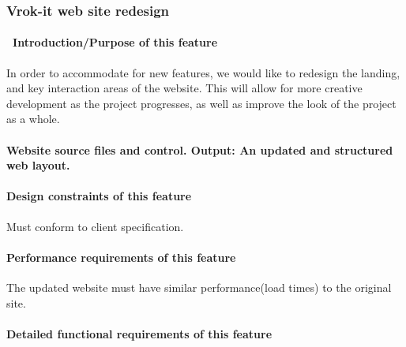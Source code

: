 \documentclass[letterpaper, 10pt, draftclsnofoot, onecolumn]{IEEEtran}
\begin{document}
{%


\subsubsection[{Redesign}]{\rmfamily\bfseries\color{black} Vrok-it  web site redesign}
\paragraph[\ Introduction/Purpose of this
feature]{\foreignlanguage{english}{\ }\foreignlanguage{english}{Introduction/Purpose
of this feature}}
{\color{black}
In order to accommodate for new features, we would like to redesign the landing,
and key interaction areas of the website. This will allow for more creative development
as the project progresses, as well as improve the look of the project as a whole.}

\paragraph[Input/Output sequence for this
feature]{\rmfamily\bfseries\color{black}
Website source files and control. Output: An updated and structured web layout.}

\paragraph[Design constraints of this
feature]{\rmfamily\bfseries\color{black} Design
constraints of this feature}
{\color{black}
Must conform to client specification.}

\paragraph[Performance requirements of this
feature]{\rmfamily\bfseries\color{black}
Performance requirements of this feature}
{\color{black}
The updated website must have similar performance(load times) to the original site.}

\paragraph[Detailed functional requirements of this
feature]{\rmfamily\bfseries\color{black}
Detailed functional requirements of this feature}



}
\end{document}
